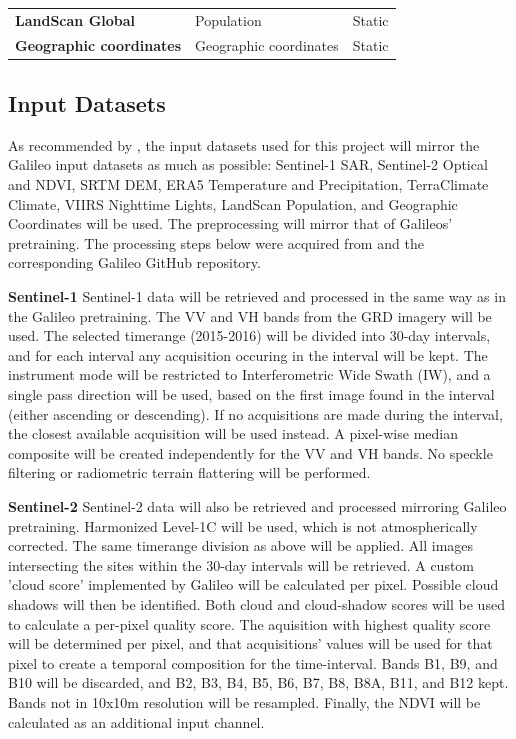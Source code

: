 \documentclass[a4paper,12pt]{article}
\makeatletter
\newenvironment{placedtable}
  {\par\addvspace{\intextsep}\noindent\begin{minipage}{\linewidth}\def\@captype{table}}
  {\end{minipage}\par\addvspace{\intextsep}}
\makeatother
\begin{document}
\begin{placedtable}
\begin{tabularx}{\textwidth}{@{}>{\raggedright\arraybackslash}p{} >{\raggedright\arraybackslash}X >{\raggedright\arraybackslash}p{}@{}}
    \textbf{LandScan Global}             & Population                                                                                  & Static                        \\[0.4em]
    \textbf{Geographic coordinates}      & Geographic coordinates                                                                      & Static                        \\[0.4em]
    \hline
  \end{tabularx}
\end{placedtable}

\subsection{Input Datasets}
As recommended by \citet{nedungadiFoundationModelsMeet2026}, the input datasets used for this project will mirror the Galileo input datasets as much as possible: Sentinel-1 SAR,
Sentinel-2 Optical and NDVI, SRTM DEM, ERA5 Temperature and Precipitation, TerraClimate Climate,
VIIRS Nighttime Lights, LandScan Population, and Geographic Coordinates will be used. The preprocessing will mirror that of Galileos' pretraining. The processing steps below were acquired from \citet{tsengGalileoLearningGlobal2025} and the corresponding Galileo GitHub repository.

\textbf{Sentinel-1} Sentinel-1 data will be retrieved and processed in the same way as in the Galileo pretraining. The VV and VH bands from the GRD imagery will be used. The selected timerange (2015-2016) will be divided into 30-day intervals, and for each interval any acquisition occuring in the interval will be kept. The instrument mode will be restricted to Interferometric Wide Swath (IW), and a single pass direction will be used, based on the first image found in the interval (either ascending or descending). If no acquisitions are made during the interval, the closest available acquisition will be used instead. A pixel-wise median composite will be created independently for the VV and VH bands. No speckle filtering or radiometric terrain flattering will be performed.

\textbf{Sentinel-2} Sentinel-2 data will also be retrieved and processed mirroring Galileo pretraining. Harmonized Level-1C will be used, which is not atmospherically corrected. The same timerange division as above will be applied. All images intersecting the sites within the 30-day intervals will be retrieved. A custom 'cloud score' implemented by Galileo will be calculated per pixel. Possible cloud shadows will then be identified. Both cloud and cloud-shadow scores will be used to calculate a per-pixel quality score. The aquisition with highest quality score will be determined per pixel, and that acquisitions' values will be used for that pixel to create a temporal composition for the time-interval. Bands B1, B9, and B10 will be discarded, and B2, B3, B4, B5, B6, B7, B8, B8A, B11, and B12 kept. Bands not in 10x10m resolution will be resampled. Finally, the \ac{NDVI} will be calculated as an additional input channel.
\end{document}

